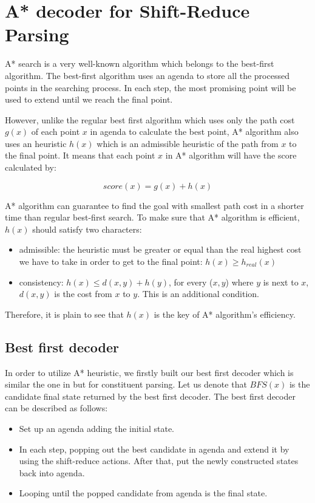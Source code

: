 \section{A* decoder for Shift-Reduce Parsing}
A* search is a very well-known algorithm which belongs to the best-first algorithm. The best-first algorithm uses an agenda to store all the processed points in the searching process. In each step, the most promising point will be used to extend until we reach the final point. 

However, unlike the regular best first algorithm which uses only the path cost $g(x)$ of each point $x$ in agenda to calculate the best point, A* algorithm also uses an heuristic $h(x)$ which is an admissible heuristic of the path from $x$ to the final point. It means that each point $x$ in A* algorithm will have the score calculated by:

\begin{equation}
	score(x) = g(x)+h(x)
\end{equation}

A* algorithm can guarantee to find the goal with smallest path cost in a shorter time than regular best-first search. To make sure that A* algorithm is efficient, $h(x)$ should satisfy two characters:
\begin{itemize}
	\item admissible: the heuristic must be greater or equal than the real highest cost we have to take in order to get to the final point: $h(x) \geq h_{real}(x)$
	\item consistency: $h(x) \leq d(x,y)+h(y)$, for every ($x,y$) where $y$ is next to $x$, $d(x,y)$ is the cost from $x$ to $y$. This is an additional condition.
\end{itemize}
Therefore, it is plain to see that $h(x)$ is the key of A* algorithm's efficiency.

\subsection{Best first decoder}
In order to utilize A* heuristic, we firstly built our best first decoder which is similar the one in \cite{ref:2014David} but for constituent parsing. Let us denote that $BFS(x)$ is the candidate final state returned by the best first decoder. The best first decoder can be described as follows:
\begin{itemize}
	\item Set up an agenda adding the initial state.
	\item In each step, popping out the best candidate in agenda and extend it by using the shift-reduce actions. After that, put the newly constructed states back into agenda.
	\item Looping until the popped candidate from agenda is the final state.
\end{itemize}

